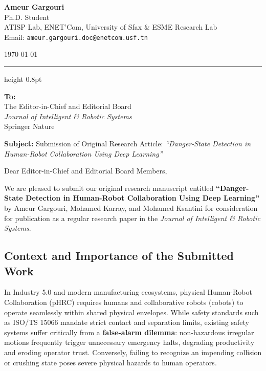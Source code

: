 \documentclass[11pt,a4paper]{article}
\begin{document}
\begin{minipage}[t]{0.65\textwidth}
    {\large \textbf{Ameur Gargouri}} \\
    Ph.D. Student \\
    ATISP Lab, ENET'Com, University of Sfax \& ESME Research Lab \\
    Email: \texttt{ameur.gargouri.doc@enetcom.usf.tn}
\end{minipage}
\hfill
\begin{minipage}[t]{0.30\textwidth}
    \raggedleft
    \today
\end{minipage}

\vspace{1.0em}
\hrule height 0.8pt
\vspace{0.9em}

\textbf{To:} \\
The Editor-in-Chief and Editorial Board \\
\textit{Journal of Intelligent \& Robotic Systems} \\
Springer Nature

\vspace{0.6em}

\textbf{Subject:} Submission of Original Research Article: \textit{``Danger-State Detection in Human-Robot Collaboration Using Deep Learning''}

\vspace{0.5em}

Dear Editor-in-Chief and Editorial Board Members,

We are pleased to submit our original research manuscript entitled \textbf{``Danger-State Detection in Human-Robot Collaboration Using Deep Learning''} by Ameur Gargouri, Mohamed Karray, and Mohamed Ksantini for consideration for publication as a regular research paper in the \textit{Journal of Intelligent \& Robotic Systems}.

\subsection*{Context and Importance of the Submitted Work}
In Industry 5.0 and modern manufacturing ecosystems, physical Human-Robot Collaboration (pHRC) requires humans and collaborative robots (cobots) to operate seamlessly within shared physical envelopes. While safety standards such as ISO/TS 15066 mandate strict contact and separation limits, existing safety systems suffer critically from a \textbf{false-alarm dilemma}: non-hazardous irregular motions frequently trigger unnecessary emergency halts, degrading productivity and eroding operator trust. Conversely, failing to recognize an impending collision or crushing state poses severe physical hazards to human operators.
\end{document}
